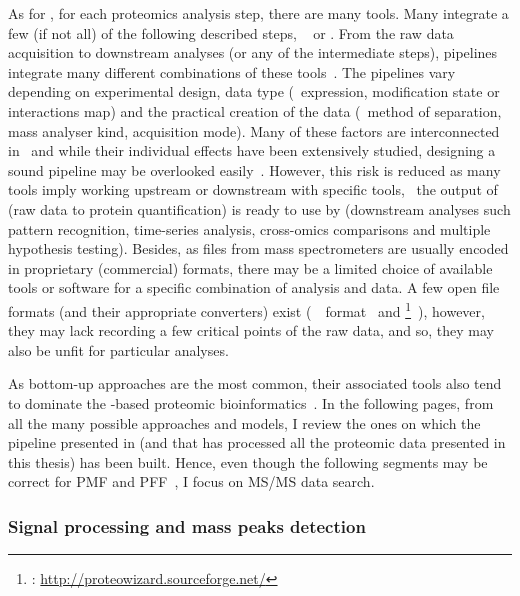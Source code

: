 As for \Rnaseq, for each proteomics analysis step,
there are many tools.
Many integrate a few (if not all) of the following described steps,
\eg\ 
or .
From the raw data acquisition to downstream analyses
(or any of the intermediate steps),
pipelines integrate many different combinations of these tools~.
The pipelines vary depending on experimental design, data type
(\ie\ expression, modification state or interactions map)
and the practical creation of the data (\eg\ method of separation,
mass analyser kind, acquisition mode).
Many of these factors are interconnected in \ms\
and while their individual effects have been extensively studied,
designing a sound pipeline may be overlooked easily~.
However,
this risk is reduced as
many tools imply working upstream or downstream with specific tools,
\eg\ the output of \soft{MaxQuant} (raw data to protein quantification) is
ready to use by 
(downstream analyses such pattern recognition,
time-series analysis, cross-omics comparisons and multiple hypothesis testing).
Besides, as files from mass spectrometers are usually encoded
in proprietary (commercial) formats,
there may be a limited choice of available tools or software
for a specific combination of analysis and data.
A few open file formats (and their appropriate converters) exist
(\eg\ \mzml\ format~\mycite{mzML}
and \href{http://proteowizard.sourceforge.net/}{}\footnote{%
\soft{ProteoWizard}: \href{http://proteowizard.sourceforge.net/}%
{http://proteowizard.sourceforge.net/}}~\mycite{proteowizard2012}),
however, they may lack recording a few critical points of the raw data,
and so, they may also be unfit for particular analyses.

As bottom-up approaches are the most common,
their associated tools also tend to dominate
the \ms{}-based proteomic bioinformatics~.
In the following pages,
from all the many possible approaches and models,
I review the ones on which the pipeline presented in 
(and that has processed all the proteomic data presented in this thesis)
has been built.
Hence, even though the following segments may be correct for
\gls{PMF} and \gls{PFF}~,
I focus on \gls{MS/MS} data search.

\subsubsection{Signal processing and mass peaks detection}

